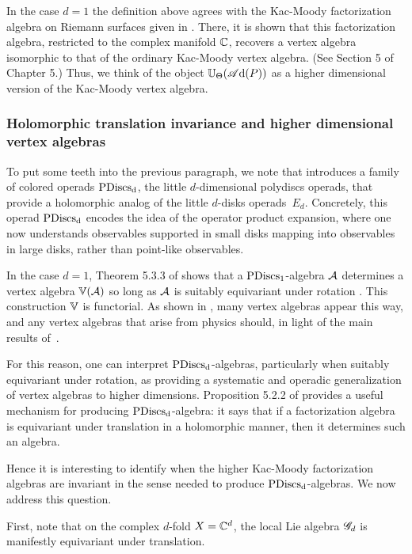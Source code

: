 In the case $d = 1$ the definition above agrees with the Kac-Moody factorization algebra on Riemann surfaces given in \cite{CG1}.
There, it is shown that this factorization algebra, restricted to the complex manifold $\mathbb C$, recovers a vertex algebra isomorphic to that of the ordinary Kac-Moody vertex algebra.
(See Section 5 of Chapter 5.)
Thus, we think of the object $\mathbb U_\Theta(\mathscr A{\rm d}(P))$ as a higher dimensional version of the Kac-Moody vertex algebra.

\subsubsection{Holomorphic translation invariance and higher dimensional vertex algebras} \label{sec: hol trans main}

To put some teeth into the previous paragraph,
we note that \cite{CG1} introduces a family of colored operads ${\rm PDiscs_d}$, the little $d$-dimensional polydiscs operads,
that provide a holomorphic analog of the little $d$-disks operads~$E_d$.
Concretely, this operad ${\rm PDiscs_d}$ encodes the idea of the operator product expansion, 
where one now understands observables supported in small disks mapping into observables in large disks, rather than point-like observables.

In the case $d=1$, Theorem 5.3.3 of \cite{CG1} shows that a ${\rm PDiscs_1}$-algebra $\mathcal A$ determines a vertex algebra $\mathbb V(\mathcal A)$ so long as $\mathcal A$ is suitably equivariant under rotation .
This construction $\mathbb V$ is functorial.
As shown in \cite{CG1}, many vertex algebras appear this way, and any vertex algebras that arise from physics should, in light of the main results of~\cite{CG1,CG2}.

For this reason, one can interpret ${\rm PDiscs_d}$-algebras, particularly when suitably equivariant under rotation, as providing a systematic and operadic generalization of vertex algebras to higher dimensions. 
Proposition 5.2.2 of \cite{CG1} provides a useful mechanism for producing ${\rm PDiscs_d}$-algebra: 
it says that if a factorization algebra is equivariant under translation in a holomorphic manner, then it determines such an algebra.

Hence it is interesting to identify when the higher Kac-Moody factorization algebras are invariant in the sense needed to produce ${\rm PDiscs_d}$-algebras.
We now address this question.

First, note that on the complex $d$-fold $X = \mathbb C^d$, 
the local Lie algebra $\mathscr G_{d}$ is manifestly equivariant under translation.

